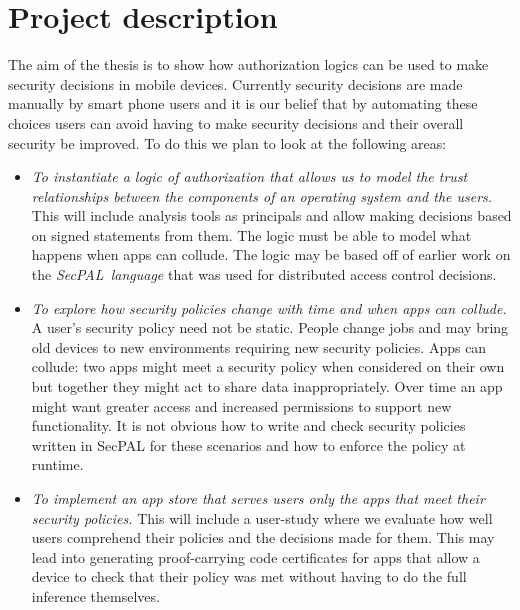 \documentclass[report.tex]{subfiles}
\begin{document}
\section{Project description}

The aim of the thesis is to show how authorization logics can be used to make
security decisions in mobile devices.  Currently security decisions are made
manually by smart phone users and it is our belief that by automating these
choices users can avoid having to make security decisions and their overall
security be improved.  To do this we plan to look at the following areas: 

\begin{itemize}

  \item \emph{To instantiate a logic of authorization that allows us to model
      the trust relationships between the components of an operating system and
      the users.}  This will include analysis tools as principals and allow
    making decisions based on signed statements from them.  The logic must be
    able to model what happens when apps can collude.  The logic may be based
    off of earlier work on the \emph{SecPAL~language}\cite{Becker:2006vh} that
    was used for distributed access control decisions.

  \item \emph{To explore how security policies change with time and when apps
      can collude.}  A user's security policy need not be static.  People change
    jobs and may bring old devices to new environments requiring new security
    policies.  Apps can collude: two apps might meet a security policy when
    considered on their own but together they might act to share data
    inappropriately.  Over time an app might want greater access and increased
    permissions to support new functionality.  It is not obvious how to write
    and check security policies written in SecPAL for these scenarios and how
    to enforce the policy at runtime.

  \item \emph{To implement an app store that serves users only the apps that
      meet their security policies.}  This will include a user-study where we
    evaluate how well users comprehend their policies and the decisions made for
    them. This may lead into generating proof-carrying code certificates for
    apps that allow a device to check that their policy was met without having
    to do the full inference themselves.


\end{itemize}
\end{document}
